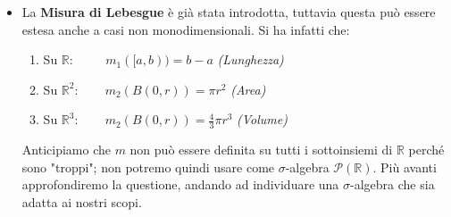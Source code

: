 \begin{itemize}[label=\(\bigstar\), align=left, labelsep=0.5em, labelwidth=!, leftmargin=0pt]
\begin{esempio}
    Caso Numerabile.\\
    \[E = \mathbb{N}^* = \mathbb{N} \setminus\{0\} = \{\alpha_n : n\geq 1\} = \{n : n\geq 1\} \xrightarrow{Associo} p_n = n \quad \forall n\geq1\]
    Sia $A\subseteq E$, tale che $A = \{n_k:k\geq1\}$, ovvero che sia una sotto-successione. La misura in questione risulta essere quindi:
    \[\mu(A) = \sum_{k=1}^\infty p_k = \sum_{k=1}^\infty \frac{1}{n_k}\]
    La quale diverge se la si calcola in $E$, rendendo la misura \textit{non} finita:
    \[\mu(E) = \sum_{n=1}^\infty p_n = \sum_{n=1}^\infty \frac{1}{n} = +\infty\]
    Tuttavia si può partizionare l'insieme $E$, andando ad identificare gli insiemi $E_k = \{k\}$, avendo così che $\mu(E_k) = 1/k < +\infty\quad \forall k \geq 1$.\\
    Se inoltre ci si accorge che \[\bigcup_{k\geq1} E_k = \bigcup \{k\} = \mathbb{N}^* = E\]
    allora si può concludere che $\mu$ sia una misura $\sigma$-finita.\\
    \\
    Questo esempio dimostra un fatto fondamentale: se ho una successione numerabile, posso sempre invadere l'insieme nella modalità appena eseguita, verificando sempre che $\mu$ sia una misura $\sigma$-finita.
\end{esempio}

Si noti che preso $E = \{\alpha_n:n\geq1\}$, ovvero un insieme numerabile, e $(p_n)_{n\geq1}:\quad p_n\geq0\quad \forall A\in\mathcal{P}(E)$, allora si avrà sempre che
\[\mu(A) = \sum_{k:\alpha_k\in A} p_k\]
e di conseguenza, si avrà che: \(\mu(E) = \sum_{n} p_n\) dimostrando che
\(\mu \text{ è finita} \iff \sum_{n} p_n < +\infty\).\\
\\
Si noti inoltre che possiamo scrivere la misura come:
\[\mu(A) = \sum_{k:\alpha_k\in A} p_k = \sum_{n=1}^\infty p_n \cdot \delta_{\alpha_n}(A)\]
ossia che possiamo vederla come una \textit{combinazione lineare} di masse di Dirac.

\item La \textbf{Misura di Lebesgue} è già stata introdotta, tuttavia questa può essere estesa anche a casi non monodimensionali. Si ha infatti che:
\begin{enumerate}
    \item Su $\mathbb{R}:\qquad \;\,m_1([a, b)) = b-a$ \hfill \textit{(Lunghezza)}
    \item Su $\mathbb{R}^2:\qquad m_2(B(0, r)) = \pi r^2$ \hfill \textit{(Area)}
    \item Su $\mathbb{R}^3:\qquad m_2(B(0, r)) = \frac{4}{3}\pi r^3$ \hfill \textit{(Volume)}
\end{enumerate}
Anticipiamo che $m$ non può essere definita su tutti i sottoinsiemi di $\mathbb{R}$ perché sono "troppi"; non potremo quindi usare come $\sigma$-algebra $\mathcal{P}(\mathbb{R})$. Più avanti approfondiremo la questione, andando ad individuare una $\sigma$-algebra che sia adatta ai nostri scopi.
\end{itemize}
